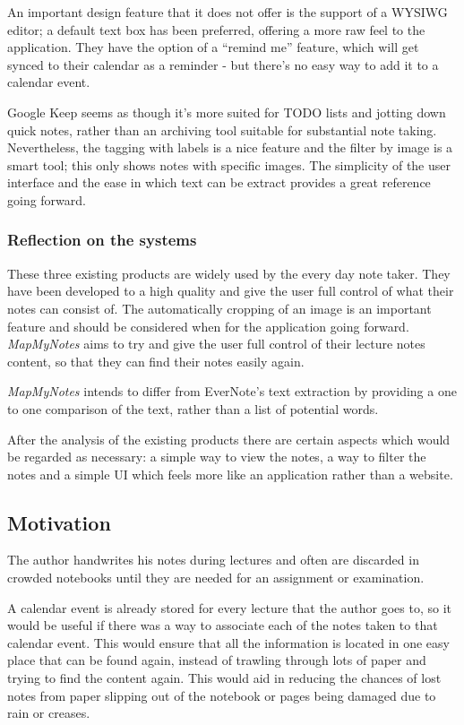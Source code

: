 An important design feature that it does not offer is the support of a WYSIWG editor; a default text box has been preferred, offering a more raw feel to the application. They have the option of a ``remind me'' feature, which will get synced to their calendar as a reminder - but there's no easy way to add it to a calendar event.

Google Keep seems as though it's more suited for TODO lists and jotting down quick notes, rather than an archiving tool suitable for substantial note taking. Nevertheless, the tagging with labels is a nice feature and the filter by image is a smart tool; this only shows notes with specific images. The simplicity of the user interface and the ease in which text can be extract provides a great reference going forward.

\subsubsection{Reflection on the systems}
These three existing products are widely used by the every day note taker. They have been developed to a high quality and give the user full control of what their notes can consist of. The automatically cropping of an image is an important feature and should be considered when for the application going forward. \textit{MapMyNotes} aims to try and give the user full control of their lecture notes content, so that they can find their notes easily again.

\textit{MapMyNotes} intends to differ from EverNote's text extraction by providing a one to one comparison of the text, rather than a list of potential words.

After the analysis of the existing products there are certain aspects which would be regarded as necessary: a simple way to view the notes, a way to filter the notes and a simple UI which feels more like an application rather than a website.


\subsection{Motivation}
The author handwrites his notes during lectures and often are discarded in crowded notebooks until they are needed for an assignment or examination.

A calendar event is already stored for every lecture that the author goes to, so it would be useful if there was a way to associate each of the notes taken to that calendar event. This would ensure that all the information is located in one easy place that can be found again, instead of trawling through lots of paper and trying to find the content again. This would aid in reducing the chances of lost notes from paper slipping out of the notebook or pages being damaged due to rain or creases.

